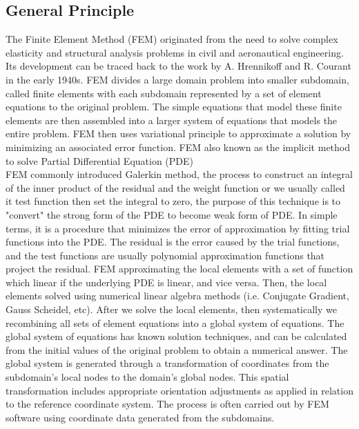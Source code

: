 \documentclass[a4paper,12pt]{article}
\begin{document}
\subsection{General Principle}
The Finite Element Method (FEM) originated from the need to solve complex elasticity and structural analysis problems in civil and aeronautical engineering. Its development can be traced back to the work by A. Hrennikoff and R. Courant in the early 1940s. FEM divides a large domain problem into smaller subdomain, called finite elements with each subdomain represented by a set of element equations to the original problem. The simple equations that model these finite elements are then assembled into a larger system of equations that models the entire problem. FEM then uses variational principle to approximate a solution by minimizing an associated error function. FEM also known as the implicit method to solve Partial Differential Equation (PDE)\\
FEM commonly introduced Galerkin method, the process to construct an integral of the inner product of the residual and the weight function or we usually called it test function then set the integral to zero, the purpose of this technique is to "convert" the strong form of the PDE to become weak form of PDE. In simple terms, it is a procedure that minimizes the error of approximation by fitting trial functions into the PDE. The residual is the error caused by the trial functions, and the test functions are usually polynomial approximation functions that project the residual. FEM approximating the local elements with a set of function which linear if the underlying PDE is linear, and vice versa. Then, the local elements solved using numerical linear algebra methods (i.e. Conjugate Gradient, Gauss Scheidel, etc). After we solve the local elements, then systematically we recombining all sets of element equations into a global system of equations. The global system of equations has known solution techniques, and can be calculated from the initial values of the original problem to obtain a numerical answer. The global system is generated through a transformation of coordinates from the subdomain's local nodes to the domain's global nodes. This spatial transformation includes appropriate orientation adjustments as applied in relation to the reference coordinate system. The process is often carried out by FEM software using coordinate data generated from the subdomains.
\end{document}
